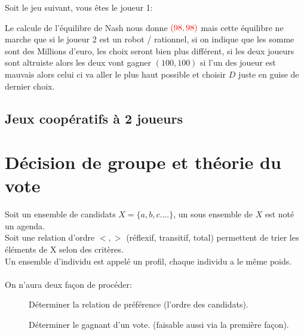 Soit le jeu suivant, vous êtes le joueur 1:
\begin{center}
\end{center}
Le calcule de l'équilibre de Nash nous donne $\textcolor{red}{(98,98)}$ mais cette équilibre ne marche que si le joueur 2 est un robot / rationnel, si on indique que les somme sont des Millions d'euro, les choix seront bien plus différent, si les deux joueurs sont altruiste alors les deux vont gagner $(100,100)$ si l'un des joueur est mauvais alors celui ci va aller le plus haut possible et choisir $D$ juste en guise de dernier choix.\\

\pagebreak
\section{Jeux coopératifs à 2 joueurs}


\pagebreak
\chapter{Décision de groupe et théorie du vote}
Soit un ensemble de candidats $X = \{a,b,c....\}$, un sous ensemble de $X$ est noté un agenda.\\
Soit une relation d'ordre $<, >$ (réflexif, transitif, total) permettent de trier les éléments de X selon des critères.\\
Un ensemble d'individu est appelé un profil, chaque individu a le même poids.\\
\\
On n'aura deux façon de procéder:
\begin{description}
\item[] Déterminer la relation de préférence (l'ordre des candidats).
\item[] Déterminer le gagnant d'un vote. (faisable aussi via la première façon). 
\end{description}
\pagebreak

